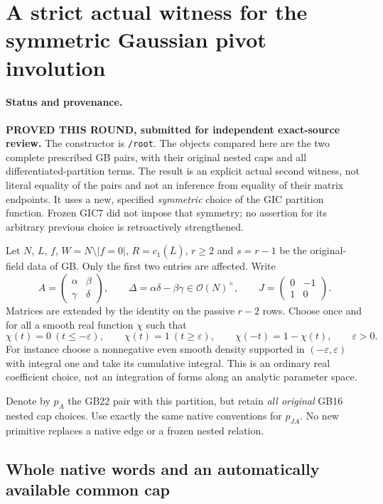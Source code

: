\section{A strict actual witness for the symmetric Gaussian pivot involution}
\label{sec:r12-symmetric-gaussian-involution}

\paragraph{Status and provenance.}
\textbf{PROVED THIS ROUND, submitted for independent exact-source review.}
The constructor is \texttt{/root}.  The objects compared here are the
two complete prescribed GB pairs, with their original nested caps and
all differentiated-partition terms.  The result is an explicit actual
second witness, not literal equality of the pairs and not an inference
from equality of their matrix endpoints.  It uses a new, specified
\emph{symmetric} choice of the GIC partition function.  Frozen GIC7
did not impose that symmetry; no assertion for its arbitrary previous
choice is retroactively strengthened.

Let $N$, $L$, $f$, $W=N\setminus|f=0|$, $R=c_1(\overline L)$,
$r\ge2$ and $s=r-1$ be the original-field data of GB.  Only the
first two entries are affected.  Write
\[
 A=\begin{pmatrix}\alpha&\beta\\\gamma&\delta\end{pmatrix},
 \qquad \Delta=\alpha\delta-\beta\gamma\in\mathcal O(N)^\times,
 \qquad J=\begin{pmatrix}0&-1\\1&0\end{pmatrix}.
 \tag{SGI1}
\]
Matrices are extended by the identity on the passive $r-2$ rows.
Choose once and for all a smooth real function $\chi$ such that
\[
 \chi(t)=0\ (t\le-\varepsilon),\qquad
 \chi(t)=1\ (t\ge\varepsilon),\qquad
 \chi(-t)=1-\chi(t),\qquad \varepsilon>0.
 \tag{SGI2}
\]
For instance choose a nonnegative even smooth density supported in
$(-\varepsilon,\varepsilon)$ with integral one and take its
cumulative integral.  This is an ordinary real coefficient choice,
not an integration of forms along an analytic parameter space.

Denote by $p_A$ the GB22 pair with this partition, but retain
\emph{all original} GB16 nested cap choices.  Use exactly the same
native conventions for $p_{JA}$.  No new primitive replaces a
native edge or a frozen nested relation.

\subsection{Whole native words and an automatically available common cap}

